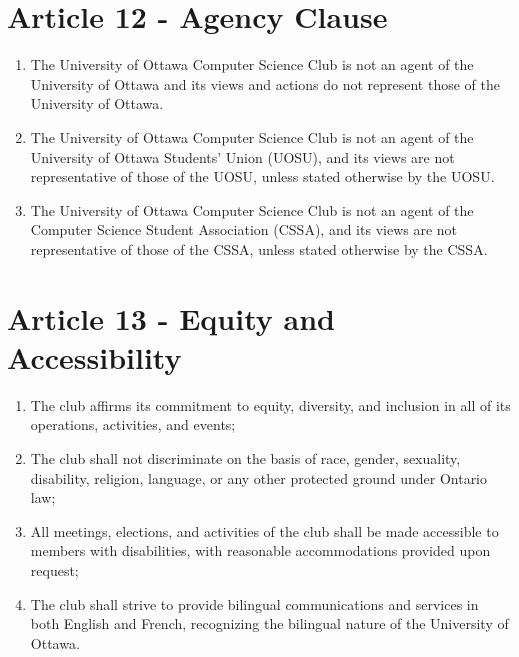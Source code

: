 \section*{Article 12 - Agency Clause}

\begin{enumerate}
    \item The University of Ottawa Computer Science Club is not an agent of the University of Ottawa and its views and actions do not represent those of the University of Ottawa.

    \item  The University of Ottawa Computer Science Club is not an agent of the University of Ottawa Students’ Union (UOSU), and its views are not representative of those of the UOSU, unless stated otherwise by the UOSU.

    \item  The University of Ottawa Computer Science Club is not an agent of the Computer Science Student Association (CSSA), and its views are not representative of those of the CSSA, unless stated otherwise by the CSSA.
\end{enumerate}


\section*{Article 13 - Equity and Accessibility}
\begin{enumerate}
    \item The club affirms its commitment to equity, diversity, and inclusion in all of its operations, activities, and events;
    \item The club shall not discriminate on the basis of race, gender, sexuality, disability, religion, language, or any other protected ground under Ontario law;
    \item All meetings, elections, and activities of the club shall be made accessible to members with disabilities, with reasonable accommodations provided upon request;
    \item The club shall strive to provide bilingual communications and services in both English and French, recognizing the bilingual nature of the University of Ottawa.
\end{enumerate}
